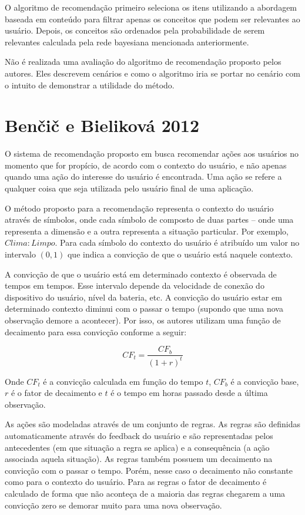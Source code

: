 O algoritmo de recomendação primeiro seleciona os itens utilizando a abordagem baseada em conteúdo para filtrar apenas
os conceitos que podem ser relevantes ao usuário. Depois, os conceitos são ordenados pela probabilidade de serem
relevantes calculada pela rede bayesiana mencionada anteriormente.

Não é realizada uma avaliação do algoritmo de recomendação proposto pelos autores. Eles descrevem cenários e como o
algoritmo iria se portar no cenário com o intuito de demonstrar a utilidade do método.

\section{Benčič e Bieliková 2012}

O sistema de recomendação proposto em  busca recomendar ações aos usuários no momento que
for propício, de acordo com o contexto do usuário, e não apenas quando uma ação do interesse do usuário é encontrada.
Uma ação se refere a qualquer coisa que seja utilizada pelo usuário final de uma aplicação.

O método proposto para a recomendação representa o contexto do usuário através de símbolos, onde cada símbolo de
composto de duas partes – onde uma representa a dimensão e a outra representa a situação particular. Por exemplo,
$Clima:Limpo$. Para cada símbolo do contexto do usuário é atribuído um valor no intervalo $(0, 1)$ que indica a convicção
de que o usuário está naquele contexto.

A convicção de que o usuário está em determinado contexto é observada de tempos em tempos. Esse intervalo depende da
velocidade de conexão do dispositivo do usuário, nível da bateria, etc. A convicção do usuário estar em determinado
contexto diminui com o passar o tempo (supondo que uma nova observação demore a acontecer). Por isso, os autores
utilizam uma função de decaimento para essa convicção conforme a seguir:

\begin{equation}
  CF_t = \frac{CF_b}{(1+r)^t}
  \label{eq:bencic-conviccao}
\end{equation}

Onde $CF_t$ é a convicção calculada em função do tempo $t$, $CF_b$ é a convicção base, $r$ é o fator de decaimento e $t$
é o tempo em horas passado desde a última observação.

As ações são modeladas através de um conjunto de regras. As regras são definidas automaticamente através do feedback do
usuário e são representadas pelos antecedentes (em que situação a regra se aplica) e a consequência (a ação associada
aquela situação). As regras também possuem um decaimento na convicção com o passar o tempo. Porém, nesse caso o
decaimento não constante como para o contexto do usuário. Para as regras o fator de decaimento é calculado de forma
que não aconteça de a maioria das regras chegarem a uma convicção zero se demorar muito para uma nova observação.

